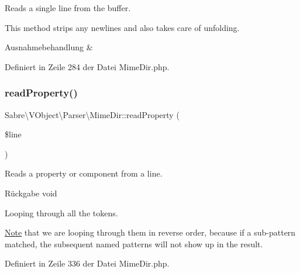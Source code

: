 Reads a single line from the buffer.

This method strips any newlines and also takes care of unfolding.


\begin{DoxyExceptions}{Ausnahmebehandlung}
{\em } & \\
\hline
\end{DoxyExceptions}


Definiert in Zeile 284 der Datei Mime\+Dir.\+php.

\mbox{\label{class_sabre_1_1_v_object_1_1_parser_1_1_mime_dir_a59f31eadb05920e4ab6de183e02870bb}} 
\subsubsection{\texorpdfstring{read\+Property()}{readProperty()}}
{\footnotesize\ttfamily Sabre\textbackslash{}\+V\+Object\textbackslash{}\+Parser\textbackslash{}\+Mime\+Dir\+::read\+Property (\begin{DoxyParamCaption}\item[{}]{\$line }\end{DoxyParamCaption})\hspace{0.3cm}{\ttfamily [protected]}}

Reads a property or component from a line.

\begin{DoxyReturn}{Rückgabe}
void 
\end{DoxyReturn}
Looping through all the tokens.

\mbox{\hyperlink{class_note}{Note}} that we are looping through them in reverse order, because if a sub-\/pattern matched, the subsequent named patterns will not show up in the result.

Definiert in Zeile 336 der Datei Mime\+Dir.\+php.

\mbox{\label{class_sabre_1_1_v_object_1_1_parser_1_1_mime_dir_a4deec4df6c9a7a24467943948d13eb31}} 

